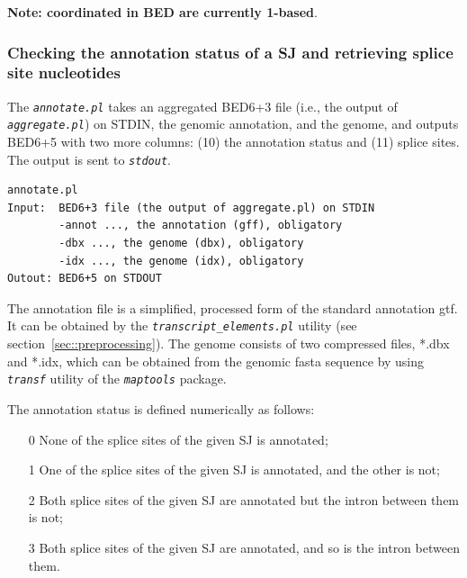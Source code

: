 \documentclass{article}
\newcommand{\prog}[1]{{\tt\em #1}}
\begin{document}
{\bf Note: coordinated in BED are currently 1-based}.


\subsubsection[Annotation status and splice site nucleotides]{Checking the annotation status of a SJ and retrieving splice site nucleotides}
\label{sec::annotation_status}
The \prog{annotate.pl} takes an aggregated BED6+3 file (i.e., the output of \prog{aggregate.pl}) on STDIN, the genomic annotation, and the genome, and outputs BED6+5 
with two more columns: (10) the annotation status and (11) splice sites. The output is sent to \prog{stdout}.
\begin{verbatim}
annotate.pl
Input:  BED6+3 file (the output of aggregate.pl) on STDIN
        -annot ..., the annotation (gff), obligatory
        -dbx ..., the genome (dbx), obligatory
        -idx ..., the genome (idx), obligatory
Outout: BED6+5 on STDOUT
\end{verbatim}
The annotation file is a simplified, processed form of the standard annotation gtf. It can be obtained by the \prog{transcript\_elements.pl} utility (see section~\ref{sec::preprocessing}).
The genome consists of two compressed files, *.dbx and *.idx, which can be obtained from the genomic fasta sequence by using \prog{transf} utility of the \prog{maptools} package. 

The annotation status is defined numerically as follows:
\begin{enumerate}
\item[0] None of the splice sites of the given SJ is annotated;
\item[1] One of the splice sites of the given SJ is annotated, and the other is not;
\item[2] Both splice sites of the given SJ are annotated but the intron between them is not;
\item[3] Both splice sites of the given SJ are annotated, and so is the intron between them.
\end{enumerate}
\end{document}
